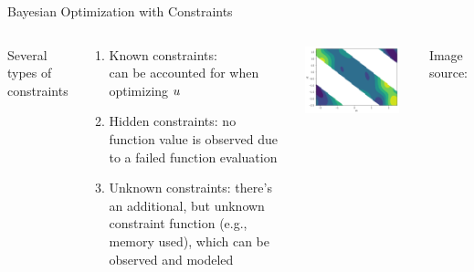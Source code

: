 \begin{frame}[c]{Bayesian Optimization with Constraints}

\begin{columns}[T]


Several types of constraints 
\begin{small}
\begin{enumerate}
    \item \alert{Known constraints}:\\ can be accounted for when optimizing $u$
    \item \alert{Hidden constraints}: no function value is observed due to a failed function evaluation~
    \item \alert{Unknown constraints}: there's an additional, but unknown constraint function (e.g., memory used), which can be observed and modeled
\end{enumerate}
\end{small}

\includegraphics[width=0.9\textwidth]{images/extensions/notebooks_constrained_bo_4_0.png}\\
\vspace*{-0.5cm}
\begin{center}
	\footnotesize{Image source: }
\end{center}	
\end{columns}


\end{frame}

